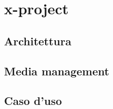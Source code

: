 \part{x-project}
	\label{seconda}
	

	\chapter{Architettura}
		\label{cha:architettura}
		

	\chapter{Media management}
		\label{cha:media_management}
		


	\chapter{Caso d'uso}
		\label{cha:caso_uso}
		